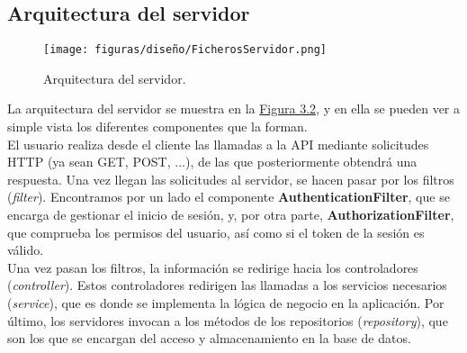 \subsection{Arquitectura  del servidor}

\begin{figure}[H]
\centerline{\texttt{[image: figuras/diseño/FicherosServidor.png]}}
\caption{Arquitectura del servidor.}
\label{enlaceArquitecturaServidor}
\end{figure}

La arquitectura del servidor se muestra en la \hyperref[enlaceArquitecturaServidor]{Figura 3.2}, y en ella se pueden ver a simple vista los diferentes componentes que la forman.
\\

El usuario realiza desde el cliente las llamadas a la API mediante solicitudes HTTP (ya sean GET, POST, ...), de las que posteriormente obtendrá una respuesta. Una vez llegan las solicitudes al servidor, se hacen pasar por los filtros ({\it filter}). Encontramos por un lado el componente {\bf AuthenticationFilter}, que se encarga de gestionar el inicio de sesión, y, por otra parte, {\bf AuthorizationFilter}, que comprueba los permisos del usuario, así como si el token de la sesión es válido.
\\

Una vez pasan los filtros, la información se redirige hacia los controladores ({\it controller}). Estos controladores redirigen las llamadas a los servicios necesarios ({\it service}), que es donde se implementa la lógica de negocio en la aplicación. Por último, los servidores invocan a los métodos de los repositorios ({\it repository}), que son los que se encargan del acceso y almacenamiento en la base de datos.
\\

